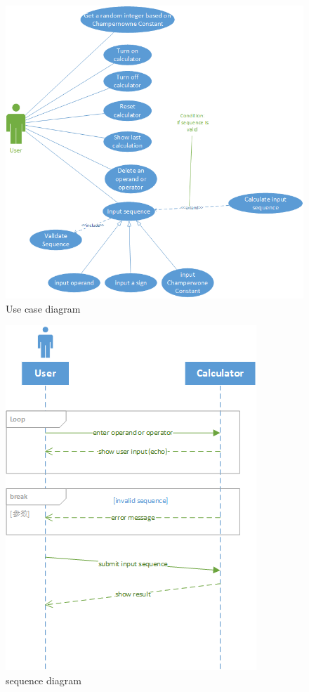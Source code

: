 \documentclass[10pt]{article}
\begin{document}
\begin{center}
  \begin{figure}
      \centering
      \includegraphics[width=0.9\linewidth]{image/useCaseDiagram.png}
      \caption{Use case diagram}
      \label{fig:my_label}
  \end{figure}
\end{center}

\begin{center}
  \begin{figure}
      \centering
      \includegraphics[width=0.7\linewidth]{image/sequenceDiagram.png}
      \caption{sequence diagram}
      \label{fig:my_label}
  \end{figure}
\end{center}
\end{document}
